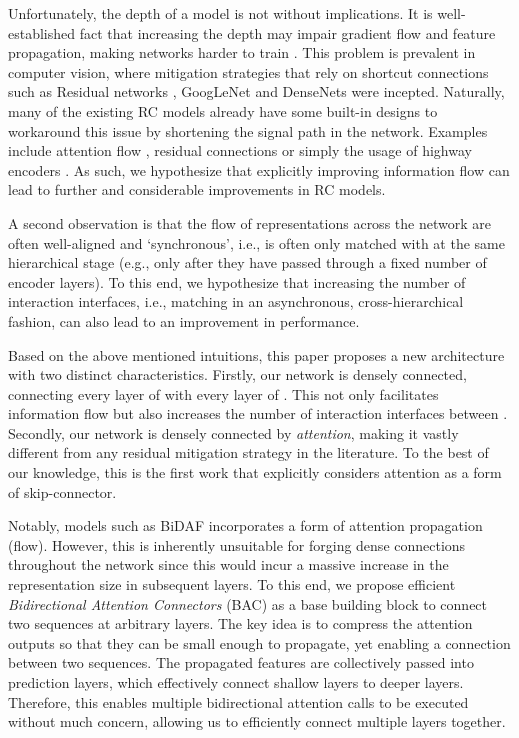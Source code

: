 \documentclass{article}
\begin{document}
Unfortunately, the depth of a model is not without implications. It is well-established fact that increasing the depth may impair gradient flow and feature propagation, making networks harder to train \citep{he2016deep,DBLP:journals/corr/SrivastavaGS15,DBLP:conf/cvpr/HuangLMW17}. This problem is prevalent in computer vision, where mitigation strategies that rely on shortcut connections such as Residual networks \citep{he2016deep}, GoogLeNet \citep{szegedy2015going} and DenseNets \citep{DBLP:conf/cvpr/HuangLMW17} were incepted. Naturally, many of the existing RC models already have some built-in designs to workaround this issue by shortening the signal path in the network. Examples include attention flow \citep{seo2016bidirectional}, residual connections \citep{xiong2017dcn+,yu2018qanet} or simply the usage of highway encoders \citep{DBLP:journals/corr/SrivastavaGS15}. As such, we hypothesize that explicitly improving information flow can lead to further and considerable improvements in RC models.

A second observation is that the flow of  representations across the network are often well-aligned and `synchronous', i.e.,  is often only matched with  at the same hierarchical stage (e.g., only after they have passed through a fixed number of encoder layers). To this end, we hypothesize that increasing the number of interaction interfaces, i.e., matching in an asynchronous, cross-hierarchical fashion, can also lead to an improvement in performance.

Based on the above mentioned intuitions, this paper proposes a new architecture with two distinct characteristics. Firstly, our network is densely connected, connecting every layer of  with every layer of . This not only facilitates information flow but also increases the number of interaction interfaces between . Secondly, our network is densely connected by \textit{attention}, making it vastly different from any residual mitigation strategy in the literature. To the best of our knowledge, this is the first work that explicitly considers attention as a form of skip-connector.

Notably, models such as BiDAF incorporates a form of attention propagation (flow). However, this is inherently unsuitable for forging dense connections throughout the network since this would incur a massive increase in the representation size in subsequent layers. To this end, we propose efficient \textit{Bidirectional Attention Connectors} (BAC) as a base building block to connect two sequences at arbitrary layers. The key idea is to compress the attention outputs so that they can be small enough to propagate, yet enabling a connection between two sequences. The propagated features are collectively passed into prediction layers, which effectively connect shallow layers to deeper layers. Therefore, this enables multiple bidirectional attention calls to be executed without much concern, allowing us to efficiently connect multiple layers together.
\end{document}
